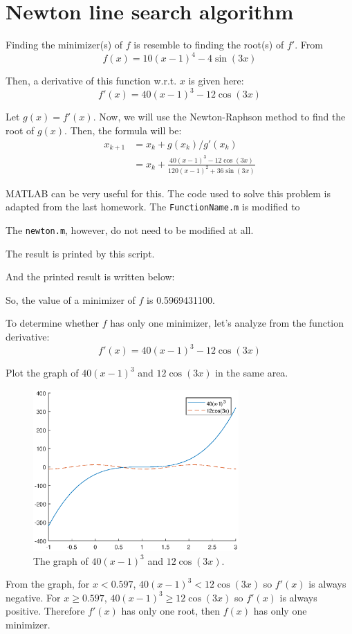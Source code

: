 \documentclass{article}
\begin{document}
\section*{Newton line search algorithm}

Finding the minimizer(s) of $f$ is resemble to finding the root(s) of $f'$. From 
$$f(x) = 10(x-1)^4 - 4\sin(3x)$$

Then, a derivative of this function w.r.t. $x$ is given here:
$$f'(x) = 40(x-1)^3 - 12\cos(3x)$$

Let $g(x) = f'(x)$. Now, we will use the Newton-Raphson method to find the root of $g(x)$. Then, the formula will be:
\begin{align*}
    x_{k+1} &= x_k + g(x_k)/g'(x_k) \\
        &= x_k + \frac{40(x-1)^3 - 12\cos(3x)}{120(x-1)^2 + 36\sin(3x)}
\end{align*}

MATLAB can be very useful for this. The code used to solve this problem is adapted from the last homework. The \lstinline{FunctionName.m} is modified to



The \lstinline{newton.m}, however, do not need to be modified at all.



The result is printed by this script.



And the printed result is written below:



So, the value of a minimizer of $f$ is 0.5969431100.

To determine whether $f$ has only one minimizer, let's analyze from the function derivative: 
$$f'(x) = 40(x-1)^3 - 12\cos(3x)$$

Plot the graph of $40(x-1)^3$ and $12\cos(3x)$ in the same area.

\begin{figure}[h]
    \centering
    \includegraphics[width = 0.7\textwidth]{plot.eps}
    \caption{The graph of $40(x-1)^3$ and $12\cos(3x)$.}
\end{figure}

From the graph, for $x < 0.597$, $40(x-1)^3 < 12\cos(3x)$ so $f'(x)$ is always negative. For $x \geq 0.597$, $40(x-1)^3 \geq 12\cos(3x)$ so $f'(x)$ is always positive. Therefore $f'(x)$ has only one root, then $f(x)$ has only one minimizer.
\end{document}
